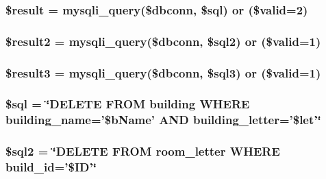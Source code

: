 \hypertarget{edBuilding_8php_a112ef069ddc0454086e3d1e6d8d55d07}{
\subsubsection[{\$result}]{\setlength{\rightskip}{0pt plus 5cm}\$result = mysqli\-\_\-query(\$dbconn, \$sql) or (\$valid=2)}}\label{edBuilding_8php_a112ef069ddc0454086e3d1e6d8d55d07}
\hypertarget{edBuilding_8php_ae734ecc68847d4f436c60c39ec64af11}{
\subsubsection[{\$result2}]{\setlength{\rightskip}{0pt plus 5cm}\$result2 = mysqli\-\_\-query(\$dbconn, \$sql2) or (\$valid=1)}}\label{edBuilding_8php_ae734ecc68847d4f436c60c39ec64af11}
\hypertarget{edBuilding_8php_a3bed351c02cbc07bce580e0044c8d37d}{
\subsubsection[{\$result3}]{\setlength{\rightskip}{0pt plus 5cm}\$result3 = mysqli\-\_\-query(\$dbconn, \$sql3) or (\$valid=1)}}\label{edBuilding_8php_a3bed351c02cbc07bce580e0044c8d37d}
\hypertarget{edBuilding_8php_a047170d6020a882807665812a27e2525}{
\subsubsection[{\$sql}]{\setlength{\rightskip}{0pt plus 5cm}\$sql = \char`\"{}\-D\-E\-L\-E\-T\-E \-F\-R\-O\-M building \-W\-H\-E\-R\-E building\-\_\-name='\$b\-Name' \-A\-N\-D building\-\_\-letter='\$let'\char`\"{}}}\label{edBuilding_8php_a047170d6020a882807665812a27e2525}
\hypertarget{edBuilding_8php_a1ad0ffe3fa0755e56a1a6bb40c232b8a}{
\subsubsection[{\$sql2}]{\setlength{\rightskip}{0pt plus 5cm}\$sql2 = \char`\"{}\-D\-E\-L\-E\-T\-E \-F\-R\-O\-M room\-\_\-letter \-W\-H\-E\-R\-E build\-\_\-id='\$\-I\-D'\char`\"{}}}\label{edBuilding_8php_a1ad0ffe3fa0755e56a1a6bb40c232b8a}
